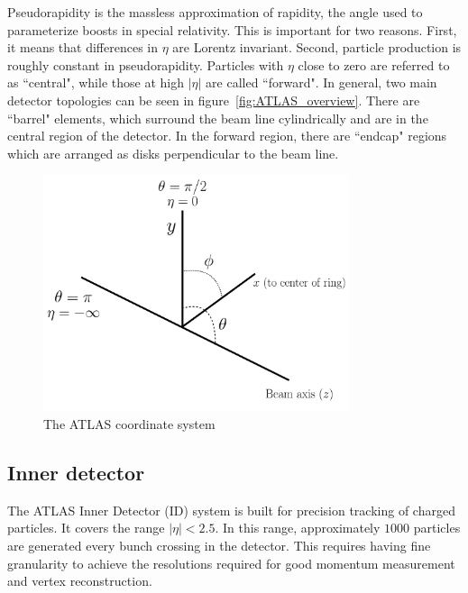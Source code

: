 Pseudorapidity is the massless approximation of rapidity, the angle used to parameterize boosts in special relativity. This is important for two reasons. First, it means that differences in $\eta$ are Lorentz invariant. Second, particle production is roughly constant in pseudorapidity. Particles with $\eta$ close to zero are referred to as ``central", while those at high $|\eta|$ are called ``forward". In general, two main detector topologies can be seen in figure~\ref{fig:ATLAS_overview}. There are ``barrel" elements, which surround the beam line cylindrically and are in the central region of the detector. In the forward region, there are ``endcap" regions which are arranged as disks perpendicular to the beam line. 

\begin{figure}[h!]
  \centering
  \captionsetup{justification=centering}

  \includegraphics[width=0.8\textwidth]{figures/ATLAS_coord}
   \caption{The ATLAS coordinate system}
  \label{fig:coord}
\end{figure}

\subsection{Inner detector}

The ATLAS Inner Detector (ID) system is built for precision tracking of charged particles. It covers the range $|\eta| < 2.5$. In this range, approximately $1000$ particles are generated every bunch crossing in the detector. This requires having fine granularity to achieve the resolutions required for good momentum measurement and vertex reconstruction. 

